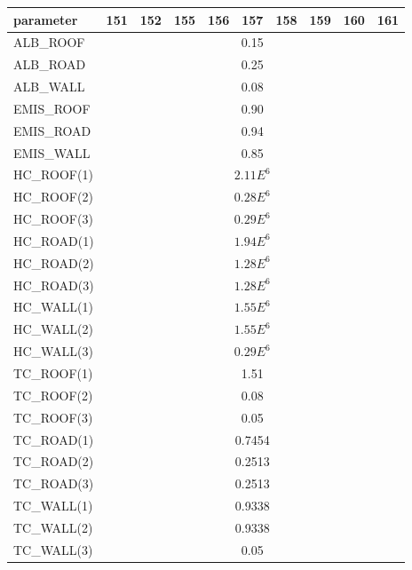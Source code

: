 \begin{table}[htbp]
\begin{center}
\begin{tabular}{|l|l|l|l|l|l|l|l|l|l| }
\hline
\textbf{parameter} & \textbf{151} & \textbf{152} & \textbf{155} & \textbf{156} & \textbf{157} & \textbf{158} & \textbf{159} & \textbf{160} & \textbf{161} \\
\hline
ALB\_ROOF & \multicolumn{9}{|c|}{0.15} \\
\hline
ALB\_ROAD &  \multicolumn{9}{|c|}{0.25} \\
\hline
ALB\_WALL & \multicolumn{9}{|c|}{0.08} \\
\hline
EMIS\_ROOF & \multicolumn{9}{|c|}{0.90} \\ 
\hline
EMIS\_ROAD & \multicolumn{9}{|c|}{0.94} \\
\hline
EMIS\_WALL & \multicolumn{9}{|c|}{0.85} \\
\hline
HC\_ROOF(1) &  \multicolumn{9}{|c|}{$2.11E^{6}$} \\
\hline
HC\_ROOF(2) &  \multicolumn{9}{|c|}{$0.28E^{6}$} \\
\hline
HC\_ROOF(3) &  \multicolumn{9}{|c|}{$0.29E^{6}$} \\
\hline
HC\_ROAD(1) &  \multicolumn{9}{|c|}{$1.94E^{6}$} \\
\hline
HC\_ROAD(2) &  \multicolumn{9}{|c|}{$1.28E^{6}$} \\
\hline
HC\_ROAD(3) &  \multicolumn{9}{|c|}{$1.28E^{6}$} \\
\hline
HC\_WALL(1) &  \multicolumn{9}{|c|}{$1.55E^{6}$} \\
\hline
HC\_WALL(2) &  \multicolumn{9}{|c|}{$1.55E^{6}$} \\
\hline
HC\_WALL(3) &  \multicolumn{9}{|c|}{$0.29E^{6}$} \\
\hline
TC\_ROOF(1) &  \multicolumn{9}{|c|}{1.51} \\
\hline
TC\_ROOF(2) &  \multicolumn{9}{|c|}{0.08} \\
\hline
TC\_ROOF(3) &  \multicolumn{9}{|c|}{0.05} \\
\hline
TC\_ROAD(1) &  \multicolumn{9}{|c|}{0.7454} \\
\hline
TC\_ROAD(2) &  \multicolumn{9}{|c|}{0.2513} \\
\hline
TC\_ROAD(3) &  \multicolumn{9}{|c|}{0.2513} \\
\hline
TC\_WALL(1) &  \multicolumn{9}{|c|}{0.9338} \\
\hline
TC\_WALL(2) &  \multicolumn{9}{|c|}{0.9338} \\
\hline
TC\_WALL(3) &  \multicolumn{9}{|c|}{0.05} \\

\end{tabular}
\end{center}
\end{table}
